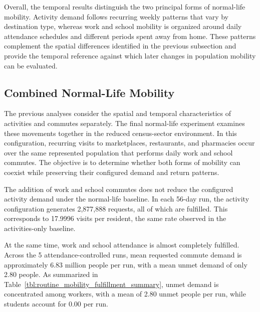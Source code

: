 Overall, the temporal results distinguish the two principal forms of normal-life mobility. Activity demand follows recurring weekly patterns that vary by destination type, whereas work and school mobility is organized around daily attendance schedules and different periods spent away from home. These patterns complement the spatial differences identified in the previous subsection and provide the temporal reference against which later changes in population mobility can be evaluated.



\subsection{Combined Normal-Life Mobility}
\label{sec:routine_mobility_combined}

The previous analyses consider the spatial and temporal characteristics of activities and commutes separately. The final normal-life experiment examines these movements together in the reduced census-sector environment. In this configuration, recurring visits to marketplaces, restaurants, and pharmacies occur over the same represented population that performs daily work and school commutes. The objective is to determine whether both forms of mobility can coexist while preserving their configured demand and return patterns.

The addition of work and school commutes does not reduce the configured activity demand under the normal-life baseline. In each 56-day run, the activity configuration generates 2,877,888 requests, all of which are fulfilled. This corresponds to 17.9996 visits per resident, the same rate observed in the activities-only baseline.

At the same time, work and school attendance is almost completely fulfilled. Across the 5 attendance-controlled runs, mean requested commute demand is approximately 6.83 million people per run, with a mean unmet demand of only 2.80 people. As summarized in Table~\ref{tbl:routine_mobility_fulfillment_summary}, unmet demand is concentrated among workers, with a mean of 2.80 unmet people per run, while students account for 0.00 per run.


